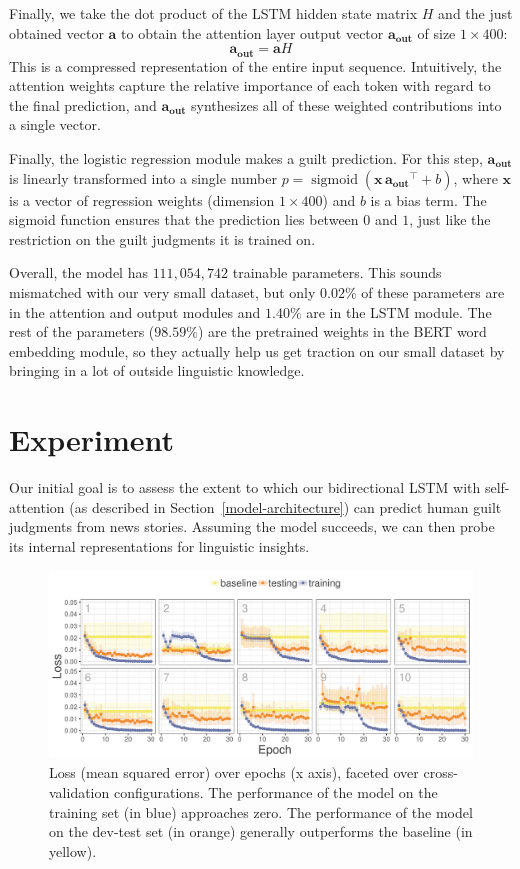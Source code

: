 \documentclass[11pt,a4paper]{article}
\DeclareMathOperator{\sigmoid}{sigmoid}
\newcommand{\aout}{\mathbf{a_{\text{out}}}}
\begin{document}
Finally, we take the dot product of the LSTM hidden state matrix $H$ and the just obtained vector $\mathbf{a}$ to obtain the attention layer output vector $\aout$ of size $1 \times 400$:
%
\begin{equation}
  \aout = \mathbf{a}H \label{eq:aout}
\end{equation}
%
This is a compressed representation of the entire input sequence. Intuitively, the attention weights capture the relative importance of each token with regard to the final prediction, and $\aout$ synthesizes all of these weighted contributions into a single vector.

Finally, the logistic regression module makes a guilt prediction. For this step, $\aout$ is linearly transformed into a single number $p = \sigmoid(\mathbf{x}\,\aout^{\top} + b)$, where $\mathbf{x}$ is a vector of regression weights (dimension $1 \times 400$) and $b$ is a bias term. The sigmoid function ensures that the prediction lies between $0$ and $1$, just like the restriction on the guilt judgments it is trained on.

Overall, the model has $111,054,742$ trainable parameters. This sounds mismatched with our very small dataset, but only $0.02\%$ of these parameters are in the attention and output modules and $1.40\%$ are in the LSTM module. The rest of the parameters ($98.59\%$) are the pretrained weights in the BERT word embedding module, so they actually help us get traction on our small dataset by bringing in a lot of outside linguistic knowledge.


\section{Experiment}

Our initial goal is to assess the extent to which our bidirectional LSTM with self-attention (as described in Section~\ref{model-architecture}) can predict human guilt judgments from news stories. Assuming the model succeeds, we can then probe its internal representations for linguistic insights.

\begin{figure}
  \includegraphics[width=\linewidth]{graphs/lossPlotCropped.pdf}
  \caption{Loss (mean squared error) over epochs (x axis), faceted over cross-validation configurations. The performance of the model on the training set (in blue) approaches zero. The performance of the model on the dev-test set (in orange) generally outperforms the baseline (in yellow).}
  \label{fig:loss}
\end{figure}
\end{document}
